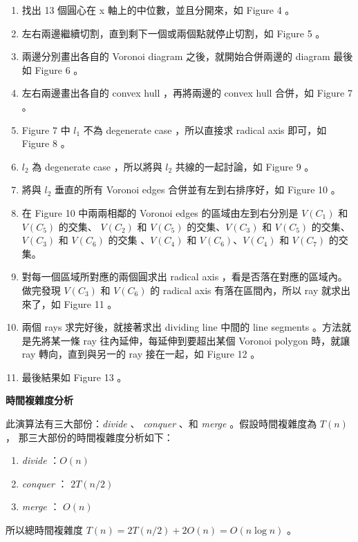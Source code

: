 \documentclass[12pt]{article}
\begin{document}
\begin{CJK}{UTF8}{bkai}
\begin{enumerate}
\item 找出 13 個圓心在 x 軸上的中位數，並且分開來，如 Figure 4 。
\item 左右兩邊繼續切割，直到剩下一個或兩個點就停止切割，如 Figure 5 。
\item 兩邊分別畫出各自的 Voronoi diagram 之後，就開始合併兩邊的 diagram
最後如 Figure 6 。
\item 左右兩邊畫出各自的 convex hull ，再將兩邊的 convex hull 合併，如 Figure 7 。
\item Figure 7 中 $l_1$ 不為 degenerate case ，所以直接求 radical axis 即可，如
 Figure 8 。
\item $l_2$ 為 degenerate case ，所以將與 $l_2$ 共線的一起討論，如 Figure 9 。
\item 將與 $l_2$ 垂直的所有 Voronoi edges 合併並有左到右排序好，如 Figure 10 。
\item 在 Figure 10 中兩兩相鄰的 Voronoi edges 的區域由左到右分別是 $V(C_1)$ 和 $V(C_5)$ 的交集、
 $V(C_2)$ 和 $V(C_5)$ 的交集、$V(C_3)$ 和 $V(C_5)$ 的交集、 $V(C_3)$ 和 $V(C_6)$ 的交集
、$V(C_4)$ 和 $V(C_6)$、$V(C_4)$ 和 $V(C_7)$ 的交集。
\item 對每一個區域所對應的兩個圓求出 radical axis ，看是否落在對應的區域內。做完發現
 $V(C_3)$ 和 $V(C_6)$ 的 radical axis 有落在區間內，所以 ray 就求出來了，如 Figure 11 。
\item 兩個 rays 求完好後，就接著求出 dividing line 中間的 line segments 。方法就是先將某一條
 ray 往內延伸，每延伸到要超出某個 Voronoi polygon 時，就讓 ray 轉向，直到與另一的 ray 接在一起，如 Figure 12 。
\item 最後結果如 Figure 13 。

\end{enumerate}

\centerline{\bf 時間複雜度分析}

此演算法有三大部份：{\it divide} 、 {\it conquer} 、和 {\it merge} 。假設時間複雜度為 $T(n)$，
那三大部份的時間複雜度分析如下：\\

\begin{enumerate}
\item {\it divide} ：$O(n)$\\
\item {\it conquer} ： $2T(n/2)$\\
\item {\it merge} ： $O(n)$\\
\end{enumerate}

所以總時間複雜度 $T(n)=2T(n/2)+2O(n)=O(n\log n)$ 。



\end{CJK}
\end{document}
